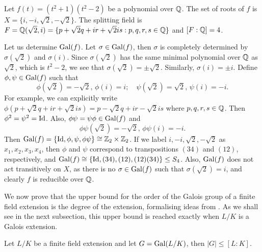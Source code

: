 \begin{example} \label{exm:galois-group}
	Let $f(t) = (t^2 + 1)(t^2 - 2)$ be a polynomial over $\mathbb Q$. The set of roots of $f$ is $X = \{i, -i, \sqrt 2, -\sqrt 2\}$. The splitting field is $F = \mathbb Q(\sqrt 2, i) = \{p+\sqrt 2 q + i r + \sqrt 2 i s : p, q, r, s \in \mathbb Q\}$ and $[F : \mathbb Q] = 4$. 
	
	Let us determine $\operatorname{Gal}(f)$. Let $\sigma \in \operatorname{Gal}(f)$, then $\sigma$ is completely determined by $\sigma(\sqrt 2)$ and $\sigma(i)$. Since $\sigma(\sqrt 2)$ has the same minimal polynomial over $\mathbb Q$ as $\sqrt 2$, which is $t^2 - 2$, we see that $\sigma(\sqrt 2) = \pm \sqrt 2$. Similarly, $\sigma(i) = \pm i$. Define $\phi, \psi \in \operatorname{Gal}(f)$ such that 
	$$
		\phi(\sqrt 2) = -\sqrt 2, \, \phi(i) = i; \quad
		\psi(\sqrt 2) = \sqrt 2, \, \psi (i) = -i. 
	$$
	For example, we can explicitly write $\phi(p + \sqrt 2 q + i r + \sqrt 2 i s) = p - \sqrt 2 q + i r - \sqrt 2 i s$ where $p,q,r,s \in \mathbb Q$. Then $\phi ^ 2 = \psi ^ 2 = \operatorname{Id}$. Also, $\phi\psi  = \psi \phi \in \operatorname{Gal}(f)$ and $$\phi\psi(\sqrt 2) = -\sqrt 2, \, \phi\psi(i) = -i. $$
	Then $\operatorname{Gal}(f) = \{\operatorname{Id}, \phi, \psi, \phi \psi \} \cong \mathbb Z_2 \times \mathbb Z_2$. If we label $i, -i, \sqrt 2, -\sqrt 2$ as $x_1, x_2, x_3, x_4$, then $\phi$ and $\psi$ correspond to transpositions $(34)$ and $(12)$, respectively, and $\operatorname{Gal}(f) \cong \{\operatorname{Id}, (34), (12), (12)(34)\} \le S_4$. Also, $\operatorname{Gal}(f)$ does not act transitively on $X$, as there is no $\sigma \in \operatorname{Gal}(f)$ such that $\sigma(\sqrt 2) = i$, and clearly $f$ is reducible over $\mathbb Q$.
\end{example}

We now prove that the upper bound for the order of the Galois group of a finite field extension is the degree of the extension, formalising ideas from  \cite[Lecture~8]{galois-theory-lectures}. As we shall see in the next subsection, this upper bound is reached exactly when $L/K$ is a Galois extension. 

\begin{theorem} \label{thm:galois-group-order-upper-bound}
	Let $L/K$ be a finite field extension and let $G = \operatorname{Gal}(L/K)$, then $|G| \le [L:K]$. 
\end{theorem}


